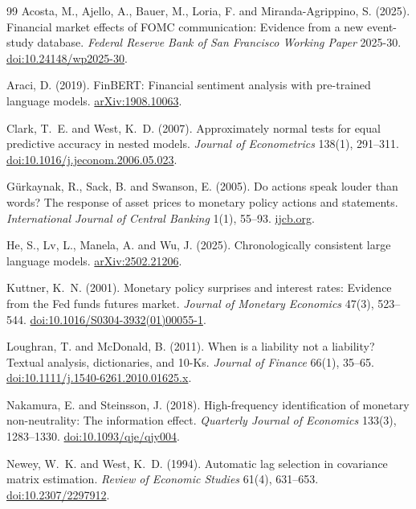 \documentclass[11pt,a4paper]{article}
\newcommand{\doi}[1]{\href{https://doi.org/#1}{doi:#1}}
\begin{document}
{\small
\renewcommand{\refname}{References}
\setlength{\bibsep}{0.25em}
\begin{thebibliography}{99}
Acosta, M., Ajello, A., Bauer, M., Loria, F. and Miranda-Agrippino, S. (2025).
Financial market effects of FOMC communication: Evidence from a new event-study database.
\emph{Federal Reserve Bank of San Francisco Working Paper} 2025-30. \doi{10.24148/wp2025-30}.

Araci, D. (2019). FinBERT: Financial sentiment analysis with pre-trained language models.
\href{https://arxiv.org/abs/1908.10063}{arXiv:1908.10063}.

Clark, T.~E. and West, K.~D. (2007). Approximately normal tests for equal predictive accuracy
in nested models. \emph{Journal of Econometrics} 138(1), 291--311.
\doi{10.1016/j.jeconom.2006.05.023}.

G\"urkaynak, R., Sack, B. and Swanson, E. (2005). Do actions speak louder than words? The
response of asset prices to monetary policy actions and statements. \emph{International Journal
of Central Banking} 1(1), 55--93.
\href{https://www.ijcb.org/journal/v1n1/do-actions-speak-louder-words-response-asset-prices-monetary-policy-actions-and}{ijcb.org}.

He, S., Lv, L., Manela, A. and Wu, J. (2025). Chronologically consistent large language models.
\href{https://arxiv.org/abs/2502.21206}{arXiv:2502.21206}.

Kuttner, K.~N. (2001). Monetary policy surprises and interest rates: Evidence from the Fed funds
futures market. \emph{Journal of Monetary Economics} 47(3), 523--544.
\doi{10.1016/S0304-3932(01)00055-1}.

Loughran, T. and McDonald, B. (2011). When is a liability not a liability? Textual analysis,
dictionaries, and 10-Ks. \emph{Journal of Finance} 66(1), 35--65.
\doi{10.1111/j.1540-6261.2010.01625.x}.

Nakamura, E. and Steinsson, J. (2018). High-frequency identification of monetary
non-neutrality: The information effect. \emph{Quarterly Journal of Economics} 133(3),
1283--1330. \doi{10.1093/qje/qjy004}.

Newey, W.~K. and West, K.~D. (1994). Automatic lag selection in covariance matrix estimation.
\emph{Review of Economic Studies} 61(4), 631--653. \doi{10.2307/2297912}.
\end{thebibliography}}
\end{document}
